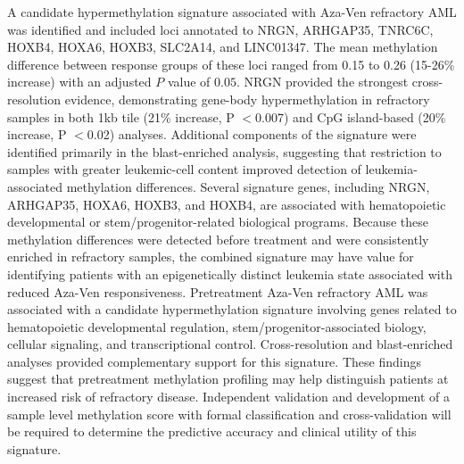     {
    A candidate hypermethylation signature associated with Aza-Ven refractory AML was identified and included loci annotated to NRGN, ARHGAP35, TNRC6C, HOXB4, HOXA6, HOXB3, SLC2A14, and LINC01347. The mean methylation difference between response groups of these loci ranged from 0.15 to 0.26 (15-26\% increase) with an adjusted $P$ value of $0.05$. NRGN provided the strongest cross-resolution evidence, demonstrating gene-body hypermethylation in refractory samples in both 1kb tile (21\% increase, P \ensuremath{<}0.007) and CpG island-based (20\% increase, P \ensuremath{<}0.02) analyses. Additional components of the signature were identified primarily in the blast-enriched analysis, suggesting that restriction to samples with greater leukemic-cell content improved detection of leukemia-associated methylation differences. Several signature genes, including NRGN, ARHGAP35, HOXA6, HOXB3, and HOXB4, are associated with hematopoietic developmental or stem/progenitor-related biological programs. Because these methylation differences were detected before treatment and were consistently enriched in refractory samples, the combined signature may have value for identifying patients with an epigenetically distinct leukemia state associated with reduced Aza-Ven responsiveness.
    }
    {
    Pretreatment Aza-Ven refractory AML was associated with a candidate hypermethylation signature involving genes related to hematopoietic developmental regulation, stem/progenitor-associated biology, cellular signaling, and transcriptional control. Cross-resolution and blast-enriched analyses provided complementary support for this signature. These findings suggest that pretreatment methylation profiling may help distinguish patients at increased risk of refractory disease. Independent validation and development of a sample level methylation score with formal classification and cross-validation will be required to determine the predictive accuracy and clinical utility of this signature.
    }

    \newpage
    